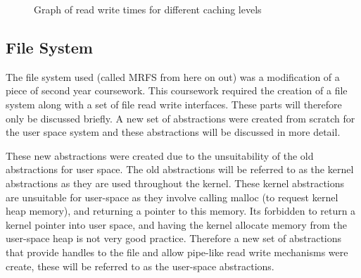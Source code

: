 \documentclass[a4paper]{report}
\begin{document}
\begin{figure}[h!]
  \begin{center}
    \caption{Graph of read write times for different caching levels}
  \end{center}
\end{figure}



















\subsection{File System}

The file system used (called MRFS from here on out) was a modification of a piece of second year coursework. This coursework required the creation of a file system along with a set of file read write interfaces. These parts will therefore only be discussed briefly. A new set of abstractions were created from scratch for the user space system and these abstractions will be discussed in more detail.

These new abstractions were created due to the unsuitability of the old abstractions for user space. The old abstractions will be referred to as the kernel abstractions as they are used throughout the kernel. These kernel abstractions are unsuitable for user-space as they involve calling malloc (to request kernel heap memory), and returning a pointer to this memory. Its forbidden to return a kernel pointer into user space, and having the kernel allocate memory from the user-space heap is not very good practice. Therefore a new set of abstractions that provide handles to the file and allow pipe-like read write mechanisms were create, these will be referred to as the user-space abstractions.
\end{document}
